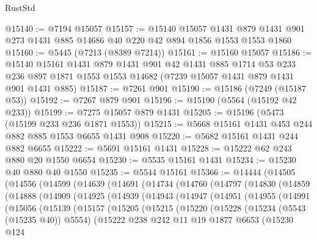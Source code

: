 \begin{lexlean}{RustStd}
\begin{coremodule}
@15140 := @7194 @15057
@15157 := @15140
    @15057
    @1431
    @879
    @1431
    @901
    @273
    @1431
    @885
    @14686
    @40
    @220
    @42
    @894
    @1856
    @1553
    @1553
    @1860
@15160 := @5445 (@7213 (@8389 @7214))
@15161 := @15160 @15057
@15186 := @15140
    @15161
    @1431
    @879
    @1431
    @901
    @42
    @1431
    @885
    @1714
    @53
    @233
    @236
    @897
    @1871
    @1553
    @1553
    @14682
    (@7239 @15057 @1431 @879 @1431 @901 @1431 @885)
@15187 := @7261 @901
@15190 := @15186 (@7249 (@15187 @53))
@15192 := @7267 @879 @901
@15196 := @15190 (@5564 (@15192 @42 @233))
@15199 := @7275 @15057 @879 @1431
@15205 := @15196 (@5473 (@15199 @233 @236 @1871 @1553))
@15215 := @5668 @15161 @1431 @453 @244 @882 @885 @1553 @6655 @1431 @908
@15220 := @5682 @15161 @1431 @244 @882 @6655
@15222 := @5691 @15161 @1431
@15228 := @15222 @62 @243 @880 @20 @1550 @6654
@15230 := @5535 @15161 @1431
@15234 := @15230 @40 @880 @40 @1550
@15235 := @5544 @15161
@15366 := @14444
    (@14505
      (@14556
        (@14599
          (@14639
            (@14691
              (@14734
                (@14760
                  (@14797
                    (@14830
                      (@14859
                        (@14888
                          (@14909
                            (@14925
                              (@14939
                                (@14943
                                  (@14947
                                    (@14951
                                      (@14955
                                        (@14991
                                          (@15056
                                            (@15139
                                              (@15157
                                                (@15205
                                                  (@15215
                                                    (@15220
                                                      (@15228
                                                        (@15234 (@5543 (@15235 @40)) @5554)
                                                        (@15222
                                                          @238
                                                          @242
                                                          @11
                                                          @19
                                                          @1877
                                                          @6653
                                                          (@15230
                                                            @124

\end{coremodule}
\end{lexlean}
